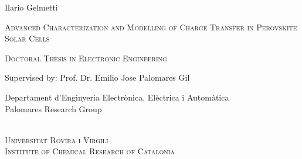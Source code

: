 \documentclass[b5paper, 12pt, openany, twoside, titlepage]{book} %
\begin{document}
\begin{titlepage}\begin{center}
		
		
		

		\bigskip
		
			\LARGE{Ilario Gelmetti}\\

		\vfill
		
		\huge{\textsc{Advanced Characterization and Modelling of Charge Transfer in Perovskite Solar Cells}}\\
		
		\bigskip\bigskip	

					\Large{\textsc{Doctoral Thesis in Electronic Engineering}}\\


				
				\bigskip
				
				\large Supervised by:
						\Large Prof. Dr. Emilio Jose Palomares Gil %

				
		\vfill		
					\bigskip
\large {Departament d'Enginyeria Electrònica, Elèctrica i Automàtica\\
Palomares Research Group}

	\bigskip\bigskip
	
	\\%
	\medskip
	\large{\textsc{Universitat Rovira i Virgili\\ Institute of Chemical Research of Catalonia}}\\
		\bigskip
		

\end{center}
\end{titlepage}
\end{document}
